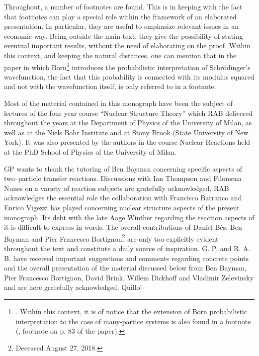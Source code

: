 Throughout, a number of footnotes are found. This is in keeping with the fact that footnotes can play a special role within the framework of an elaborated presentation. In particular, they are useful to emphasize relevant issues in an economic way. Being outside the main text, they give the possibility of stating eventual important results, without the need of elaborating on the proof. Within this context, and keeping the natural distances, one can mention that in the paper  in which Born\footnote{\cite{Born:26}. Within this context, it is of notice that the extension of Born probabilistic interpretation to the case of many-partice systems is also found in a footnote (\cite{Pauli:27}, footnote on p. 83 of the paper).} introduces the probabilistic interpretation of Schr\"odinger's  wavefunction, the fact that this probability is connected with its modulus squared and not with the wavefunction itself, is only referred to in a footnote.



Most of the material contained in this monograph have been the subject of lectures of the four year course ``Nuclear Structure Theory'' which RAB delivered throughout the years at the Department of Physics of the University of Milan, as well as at the Niels Bohr Institute and at Stony Brook (State University of New York). It was also presented by the authors in the course Nuclear Reactions held at the PhD School of Physics of the University of Milan.

GP wants to thank the tutoring of  Ben Bayman concerning specific aspects of two--particle transfer reactions. Discussions with Ian Thompson and Filomena Nunes on a variety of reaction subjects are gratefully acknowledged. 
RAB  acknowledges the essential role the collaboration with Francisco Barranco and Enrico Vigezzi has played concerning  nuclear structure aspects of the present monograph. Its debt with the late Aage Winther regarding the reaction aspects of it is difficult to express in words. The overall contributions of Daniel B\`{e}s, Ben Bayman and Pier Francesco Bortignon\footnote{Deceased August 27, 2018.} are only too explicitly evident throughout the text and constitute a daily source of inspiration.  G. P. and R. A. B. have received important suggestions and comments regarding concrete points and the overall presentation of the material discussed below from Ben Bayman, Pier Francesco Bortignon, David Brink, Willem Dickhoff and Vladimir Zelevinsky and are here gratefully acknowledged.
Quillo! \cite{Potel:10}

